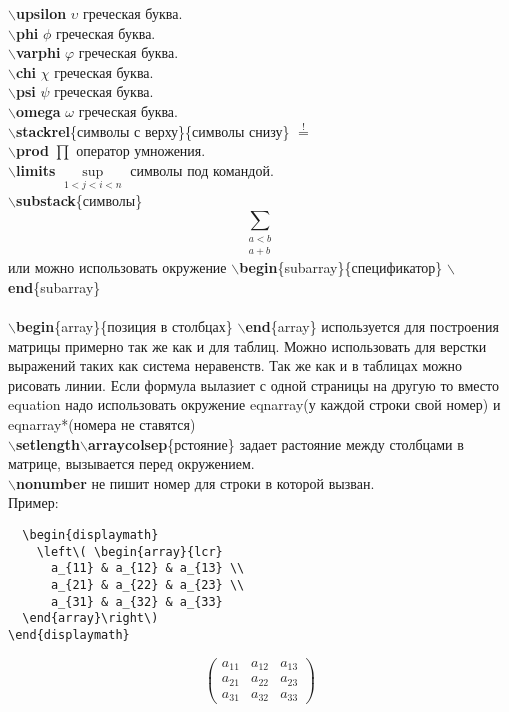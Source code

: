 \documentclass{article}
\newcommand{\bs}{$\backslash$}
\newcommand{\bd}[1]{{\bfseries #1}} %
\newcommand{\bb}[1]{\bd{\bs #1}} %
\begin{document}
\bb{upsilon} $\upsilon$ греческая буква.\\
\bb{phi} $\phi$ греческая буква.\\
\bb{varphi} $\varphi$ греческая буква.\\
\bb{chi} $\chi$ греческая буква.\\
\bb{psi} $\psi$ греческая буква.\\
\bb{omega} $\omega$ греческая буква.\\
\bb{stackrel}\{символы с верху\}\{символы снизу\} $\stackrel{!}{=}$\\
\bb{prod} $\prod$ оператор умножения.\\
\bb{limits} $\sup \limits_{1<j<i<n}$ символы под командой.\\
\bb{substack}\{символы\} \[\sum_{\substack{a<b \\ a+b}}\] или можно использовать
окружение \bb{begin}\{subarray\}\{спецификатор\} \bb{end}\{subarray\}\\ \\

\bb{begin}\{array\}\{позиция в столбцах\} \bb{end}\{array\} используется
для построения матрицы примерно так же как и для таблиц. Можно использовать
для верстки выражений таких как система неравенств. Так же как и в таблицах
можно рисовать линии. Если формула вылазиет с одной страницы на другую
то вместо equation надо использовать окружение
eqnarray(у каждой строки свой номер) и eqnarray*(номера не ставятся)\\
\bb{setlength}\bb{arraycolsep}\{рстояние\} задает растояние между столбцами в
матрице, вызывается перед окружением.\\
\bb{nonumber} не пишит номер для строки в которой вызван. \\
Пример:
\begin{verbatim}
  \begin{displaymath}
    \left\( \begin{array}{lcr}
      a_{11} & a_{12} & a_{13} \\
      a_{21} & a_{22} & a_{23} \\
      a_{31} & a_{32} & a_{33}
  \end{array}\right\)
\end{displaymath}
\end{verbatim}
\begin{displaymath}
  \left( \begin{array}{lcr}
    a_{11} & a_{12} & a_{13} \\
    a_{21} & a_{22} & a_{23} \\
    a_{31} & a_{32} & a_{33}
  \end{array}\right)
\end{displaymath}
\\\\
\end{document}
